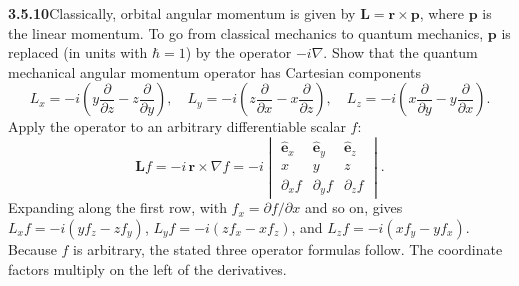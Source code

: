 \par\bigskip
\noindent\textbf{3.5.10}\quad Classically, orbital angular momentum is given
by $\mathbf{L}=\mathbf{r}\times\mathbf{p}$, where $\mathbf{p}$ is the linear
momentum. To go from classical mechanics to quantum mechanics, $\mathbf{p}$ is
replaced (in units with $\hbar=1$) by the operator $-i\nabla$. Show that the
quantum mechanical angular momentum operator has Cartesian components
\[
L_{x}=-i\left(y\frac{\partial}{\partial z}-z\frac{\partial}{\partial y}
\right),\quad
L_{y}=-i\left(z\frac{\partial}{\partial x}-x\frac{\partial}{\partial z}
\right),\quad
L_{z}=-i\left(x\frac{\partial}{\partial y}-y\frac{\partial}{\partial x}
\right).
\]
\solution
Apply the operator to an arbitrary differentiable scalar $f$:
\[
\mathbf Lf=-i\,\mathbf r\times\nabla f
=-i\begin{vmatrix}
\hat{\mathbf e}_x&\hat{\mathbf e}_y&\hat{\mathbf e}_z\\
x&y&z\\ \partial_xf&\partial_yf&\partial_zf
\end{vmatrix}.
\]
Expanding along the first row, with $f_x=\partial f/\partial x$ and so
on, gives
$L_xf=-i(yf_z-zf_y)$,
$L_yf=-i(zf_x-xf_z)$, and
$L_zf=-i(xf_y-yf_x)$.
Because $f$ is arbitrary, the stated three operator formulas follow.
The coordinate factors multiply on the left of the derivatives.

